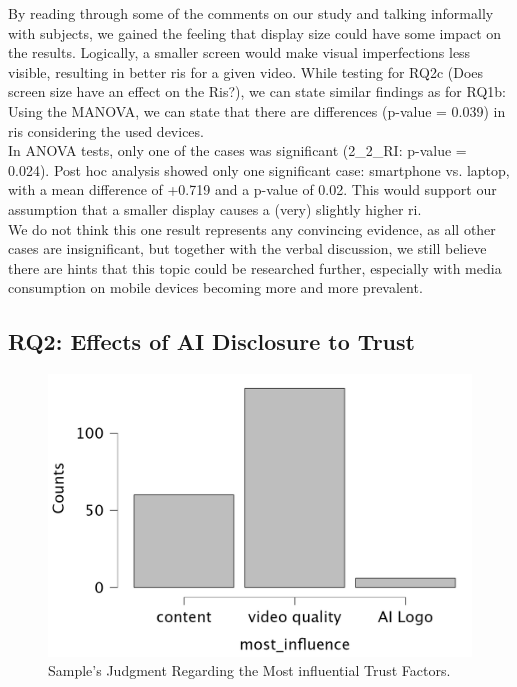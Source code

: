 \documentclass[
  a4paper,  %
  twoside,  %
  bibliography=totoc,
  headsepline,
  cleardoublepage=empty,
  parskip=half,
  draft=false
]{scrbook}
\begin{document}
By reading through some of the comments on our study and talking informally with subjects, we gained the feeling that display size could have some impact on the results. Logically, a smaller screen would make visual imperfections less visible, resulting in better \gls{ri}s for a given video. While testing for RQ2c (Does screen size have an effect on the Ris?), we can state similar findings as for RQ1b: Using the MANOVA, we can state that there are differences (p-value = 0.039) in \gls{ri}s considering the used devices. \\
In ANOVA tests, only one of the cases was significant (2\_2\_RI: p-value = 0.024). Post hoc analysis showed only one significant case: smartphone vs. laptop, with a mean difference of +0.719 and a p-value of 0.02. This would support our assumption that a smaller display causes a (very) slightly higher \gls{ri}. \\
We do not think this one result represents any convincing evidence, as all other cases are insignificant, but together with the verbal discussion, we still believe there are hints that this topic could be researched further, especially with media consumption on mobile devices becoming more and more prevalent.

\subsection{RQ2: Effects of AI Disclosure to Trust}
\label{subsec:RQ2}

\begin{figure}[h]
  \centering
  \includegraphics[width=.5\textwidth]{graphics/statistics/most-influence.png}
  \caption{Sample's Judgment Regarding the Most influential Trust Factors.}
  \label{fig:most-influence}
\end{figure}
\end{document}
